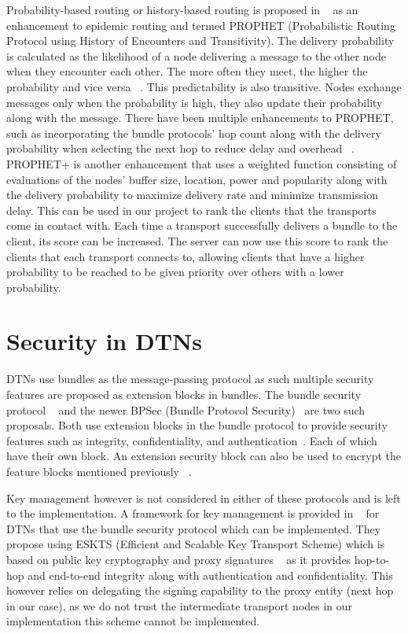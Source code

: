 Probability-based routing or history-based routing is proposed in ~\cite{rw10} as an enhancement to epidemic routing and termed PROPHET (Probabilistic Routing Protocol using History of Encounters and Transitivity). The delivery probability is calculated as the likelihood of a node delivering a message to the other node when they encounter each other. The more often they meet, the higher the probability and vice versa ~\cite{rw11}. This predictability is also transitive. Nodes exchange messages only when the probability is high, they also update their probability along with the message. There have been multiple enhancements to PROPHET, such as incorporating the bundle protocols' hop count along with the delivery probability when selecting the next hop to reduce delay and overhead ~\cite{rw12}. PROPHET+ is another enhancement that uses a weighted function consisting of evaluations of the nodes' buffer size, location, power and popularity along with the delivery probability to maximize delivery rate and minimize transmission delay. This can be used in our project to rank the clients that the transports come in contact with. Each time a transport successfully delivers a bundle to the client, its score can be increased. The server can now use this score to rank the clients that each transport connects to, allowing clients that have a higher probability to be reached to be given priority over others with a lower probability.

\section{Security in DTNs}

DTNs use bundles as the message-passing protocol as such multiple security features are proposed as extension blocks in bundles. The bundle security protocol ~\cite{rw4} and the newer BPSec (Bundle Protocol Security)~\cite{rw13} are two such proposals. Both use extension blocks in the bundle protocol to provide security features such as integrity, confidentiality, and authentication~\cite{rw13}. Each of which have their own block. An extension security block can also be used to encrypt the feature blocks mentioned previously ~\cite{rw4}.

Key management however is not considered in either of these protocols and is left to the implementation. A framework for key management is provided in ~\cite{rw14} for DTNs that use the bundle security protocol which can be implemented. They propose using ESKTS (Efficient and Scalable Key Transport Scheme) which is based on public key cryptography and proxy signatures ~\cite{rw15} as it provides hop-to-hop and end-to-end integrity along with authentication and confidentiality. This however relies on delegating the signing capability to the proxy entity (next hop in our case), as we do not trust the intermediate transport nodes in our implementation this scheme cannot be implemented.

